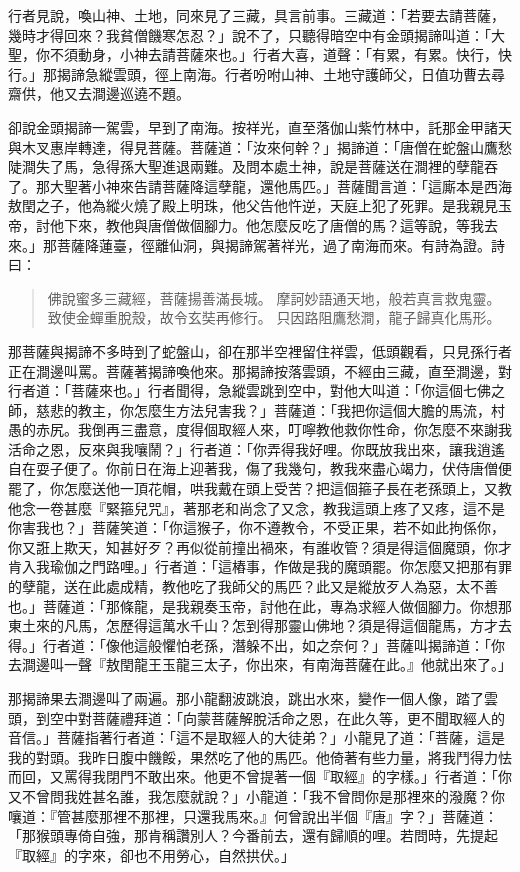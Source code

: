 行者見說，喚山神、土地，同來見了三藏，具言前事。三藏道：「若要去請菩薩，幾時才得回來？我貧僧饑寒怎忍？」說不了，只聽得暗空中有金頭揭諦叫道：「大聖，你不須動身，小神去請菩薩來也。」行者大喜，道聲：「有累，有累。快行，快行。」那揭諦急縱雲頭，徑上南海。行者吩咐山神、土地守護師父，日值功曹去尋齋供，他又去澗邊巡遶不題。

卻說金頭揭諦一駕雲，早到了南海。按祥光，直至落伽山紫竹林中，託那金甲諸天與木叉惠岸轉達，得見菩薩。菩薩道：「汝來何幹？」揭諦道：「唐僧在蛇盤山鷹愁陡澗失了馬，急得孫大聖進退兩難。及問本處土神，說是菩薩送在澗裡的孽龍吞了。那大聖著小神來告請菩薩降這孽龍，還他馬匹。」菩薩聞言道：「這廝本是西海敖閏之子，他為縱火燒了殿上明珠，他父告他忤逆，天庭上犯了死罪。是我親見玉帝，討他下來，教他與唐僧做個腳力。他怎麼反吃了唐僧的馬？這等說，等我去來。」那菩薩降蓮臺，徑離仙洞，與揭諦駕著祥光，過了南海而來。有詩為證。詩曰：
\begin{quote}
佛說蜜多三藏經，菩薩揚善滿長城。
摩訶妙語通天地，般若真言救鬼靈。
致使金蟬重脫殼，故令玄奘再修行。
只因路阻鷹愁澗，龍子歸真化馬形。
\end{quote}

那菩薩與揭諦不多時到了蛇盤山，卻在那半空裡留住祥雲，低頭觀看，只見孫行者正在澗邊叫罵。菩薩著揭諦喚他來。那揭諦按落雲頭，不經由三藏，直至澗邊，對行者道：「菩薩來也。」行者聞得，急縱雲跳到空中，對他大叫道：「你這個七佛之師，慈悲的教主，你怎麼生方法兒害我？」菩薩道：「我把你這個大膽的馬流，村愚的赤尻。我倒再三盡意，度得個取經人來，叮嚀教他救你性命，你怎麼不來謝我活命之恩，反來與我嚷鬧？」行者道：「你弄得我好哩。你既放我出來，讓我逍遙自在耍子便了。你前日在海上迎著我，傷了我幾句，教我來盡心竭力，伏侍唐僧便罷了，你怎麼送他一頂花帽，哄我戴在頭上受苦？把這個箍子長在老孫頭上，又教他念一卷甚麼『緊箍兒咒』，著那老和尚念了又念，教我這頭上疼了又疼，這不是你害我也？」菩薩笑道：「你這猴子，你不遵教令，不受正果，若不如此拘係你，你又誑上欺天，知甚好歹？再似從前撞出禍來，有誰收管？須是得這個魔頭，你才肯入我瑜伽之門路哩。」行者道：「這樁事，作做是我的魔頭罷。你怎麼又把那有罪的孽龍，送在此處成精，教他吃了我師父的馬匹？此又是縱放歹人為惡，太不善也。」菩薩道：「那條龍，是我親奏玉帝，討他在此，專為求經人做個腳力。你想那東土來的凡馬，怎歷得這萬水千山？怎到得那靈山佛地？須是得這個龍馬，方才去得。」行者道：「像他這般懼怕老孫，潛躲不出，如之奈何？」菩薩叫揭諦道：「你去澗邊叫一聲『敖閏龍王玉龍三太子，你出來，有南海菩薩在此。』他就出來了。」

那揭諦果去澗邊叫了兩遍。那小龍翻波跳浪，跳出水來，變作一個人像，踏了雲頭，到空中對菩薩禮拜道：「向蒙菩薩解脫活命之恩，在此久等，更不聞取經人的音信。」菩薩指著行者道：「這不是取經人的大徒弟？」小龍見了道：「菩薩，這是我的對頭。我昨日腹中饑餒，果然吃了他的馬匹。他倚著有些力量，將我鬥得力怯而回，又罵得我閉門不敢出來。他更不曾提著一個『取經』的字樣。」行者道：「你又不曾問我姓甚名誰，我怎麼就說？」小龍道：「我不曾問你是那裡來的潑魔？你嚷道：『管甚麼那裡不那裡，只還我馬來。』何曾說出半個『唐』字？」菩薩道：「那猴頭專倚自強，那肯稱讚別人？今番前去，還有歸順的哩。若問時，先提起『取經』的字來，卻也不用勞心，自然拱伏。」

